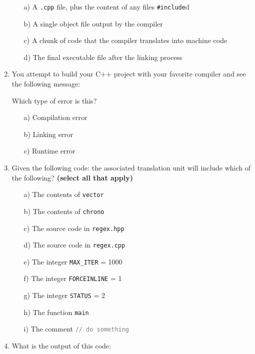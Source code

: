 \documentclass{article}
\begin{document}
\begin{enumerate}
	\begin{itemize}
		\item[a)] \textcolor{BrickRed}{A \texttt{.cpp} file, plus the content of any files \textcolor{BurntOrange}{\texttt{\#include}}d}
		\item[b)] A single object file output by the compiler
		\item[c)] A chunk of code that the compiler translates into machine code
		\item[d)] The final executable file after the linking process
	\end{itemize}
	\vspace{1em}
	\item You attempt to build your C++ project with your favorite compiler and see the following message:
	
	\noindent
	Which type of error is this?
	\begin{itemize}
		\item[a)] Compilation error
		\item[b)] \textcolor{BrickRed}{Linking error}
		\item[c)] Runtime error
	\end{itemize}
	\vspace{1em}
	\item Given the following code: 		
	the associated translation unit will include which of the following? \textbf{(select all that apply)}
	\begin{itemize}
		\item[a)] \textcolor{BrickRed}{The contents of \texttt{vector}}
		\item[b)] \textcolor{BrickRed}{The contents of \texttt{chrono}}
		\item[c)] \textcolor{BrickRed}{The source code in \texttt{regex.hpp}}
		\item[d)] The source code in \texttt{regex.cpp}
		\item[e)] The integer \texttt{MAX\_ITER} = 1000
		\item[f)] \textcolor{BrickRed}{The integer \texttt{FORCEINLINE} = 1}
		\item[g)] The integer \texttt{STATUS} = 2
		\item[h)] \textcolor{BrickRed}{The function \texttt{main}}
		\item[i)] The comment \textcolor{Gray}{\texttt{// do something}}
	\end{itemize}
	\pagebreak
	\item What is the output of this code:
	

\end{enumerate}
\end{document}
